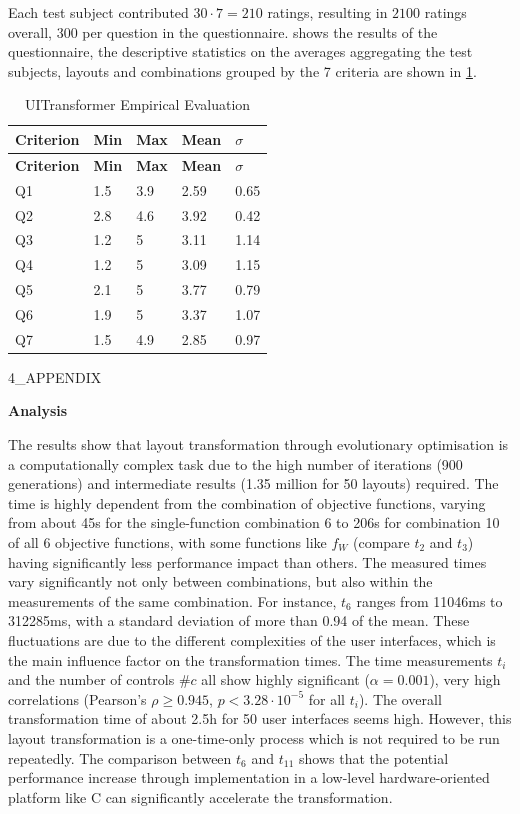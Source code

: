 Each test subject contributed \(30 \cdot 7 = 210\) ratings, resulting in \(2100\) ratings overall, \(300\) per question in the questionnaire.
 shows the results of the questionnaire, the descriptive statistics on the averages aggregating the test subjects, layouts and combinations grouped by the 7 criteria are shown in \cref{tbl:uitransformer.empirical}.

\hypertarget{tbl:uitransformer.empirical}{}
\begin{longtable}[]{@{}lllll@{}}
\caption{\label{tbl:uitransformer.empirical}UITransformer Empirical Evaluation}\tabularnewline
\toprule
\textbf{Criterion} & \textbf{Min} & \textbf{Max} & \textbf{Mean} & \textbf{\(\sigma\)}\tabularnewline
\midrule
\endfirsthead
\toprule
\textbf{Criterion} & \textbf{Min} & \textbf{Max} & \textbf{Mean} & \textbf{\(\sigma\)}\tabularnewline
\midrule
\endhead
Q1 & 1.5 & 3.9 & 2.59 & 0.65\tabularnewline
Q2 & 2.8 & 4.6 & 3.92 & 0.42\tabularnewline
Q3 & 1.2 & 5 & 3.11 & 1.14\tabularnewline
Q4 & 1.2 & 5 & 3.09 & 1.15\tabularnewline
Q5 & 2.1 & 5 & 3.77 & 0.79\tabularnewline
Q6 & 1.9 & 5 & 3.37 & 1.07\tabularnewline
Q7 & 1.5 & 4.9 & 2.85 & 0.97\tabularnewline
\bottomrule
\end{longtable}

4\_APPENDIX

\textbf{Analysis}

The results show that layout transformation through evolutionary optimisation is a computationally complex task due to the high number of iterations (900 generations) and intermediate results (1.35 million for 50 layouts) required.
The time is highly dependent from the combination of objective functions, varying from about 45s for the single-function combination 6 to 206s for combination 10 of all 6 objective functions, with some functions like \(f_W\) (compare \(t_2\) and \(t_3\)) having significantly less performance impact than others.
The measured times vary significantly not only between combinations, but also within the measurements of the same combination.
For instance, \(t_6\) ranges from 11046ms to 312285ms, with a standard deviation of more than 0.94 of the mean.
These fluctuations are due to the different complexities of the user interfaces, which is the main influence factor on the transformation times.
The time measurements \(t_i\) and the number of controls \(\# c\) all show highly significant (\(\alpha = 0.001\)), very high correlations (Pearson's \(\rho \geq 0.945\), \(p < 3.28 \cdot 10^{-5}\) for all \(t_i\)).
The overall transformation time of about 2.5h for 50 user interfaces seems high.
However, this layout transformation is a one-time-only process which is not required to be run repeatedly.
The comparison between \(t_6\) and \(t_11\) shows that the potential performance increase through implementation in a low-level hardware-oriented platform like C can significantly accelerate the transformation.

